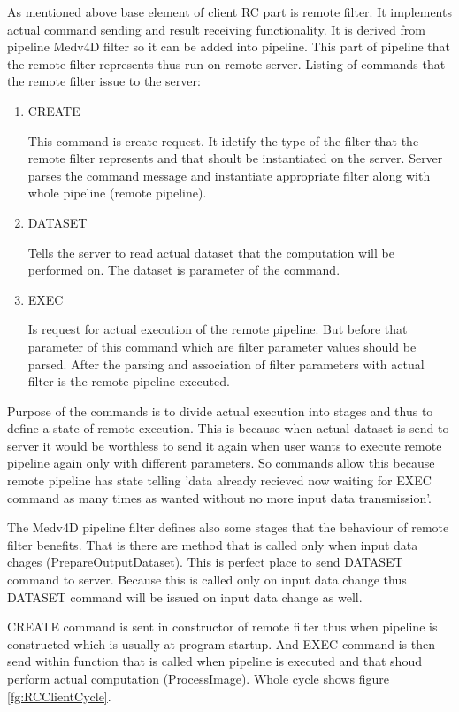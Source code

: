 As mentioned above base element of client RC part is remote filter.
It implements actual command sending and result receiving functionality.
It is derived from pipeline Medv4D filter so it can be added into pipeline.
This part of pipeline that the remote filter represents thus run on remote server.
Listing of commands that the remote filter issue to the server:
\begin{enumerate}
  \item{CREATE}
  \par
  This command is create request.
It idetify the type of the filter that the remote filter represents and that shoult be instantiated on the server.
Server parses the command message and instantiate appropriate filter along with whole pipeline (remote pipeline).

  \item{DATASET}
  \par
  Tells the server to read actual dataset that the computation will be performed on.
The dataset is parameter of the command.

  \item{EXEC}
\par
  Is request for actual execution of the remote pipeline.
But before that parameter of this command which are filter parameter values should be parsed.
After the parsing and association of filter parameters with actual filter is the remote pipeline executed.
\end{enumerate}

\par
Purpose of the commands is to divide actual execution into stages and thus to define a state of remote execution.
This is because when actual dataset is send to server it would be worthless to send it again when user wants to execute remote pipeline again only with different parameters.
So commands allow this because remote pipeline has state telling 'data already recieved now waiting for EXEC command as many times as wanted without no more input data transmission'.
\par
The Medv4D pipeline filter defines also some stages that the behaviour of remote filter benefits.
That is there are method that is called only when input data chages (PrepareOutputDataset).
This is perfect place to send DATASET command to server.
Because this is called only on input data change thus DATASET command will be issued on input data change as well.
\par
CREATE command is sent in constructor of remote filter thus when pipeline is constructed which is usually at program startup.
And EXEC command is then send within function that is called when pipeline is executed and that shoud perform actual computation (ProcessImage).
Whole cycle shows figure \ref{fg:RCClientCycle}.

